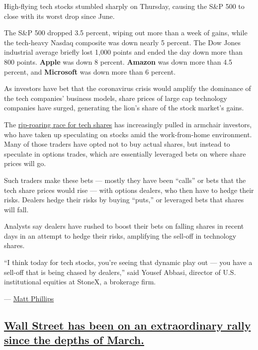 High-flying tech stocks stumbled sharply on Thursday, causing the S\&P
500 to close with its worst drop since June.

The S\&P 500 dropped 3.5 percent, wiping out more than a week of gains,
while the tech-heavy Nasdaq composite was down nearly 5 percent. The Dow
Jones industrial average briefly lost 1,000 points and ended the day
down more than 800 points. \textbf{Apple} was down 8 percent.
\textbf{Amazon} was down more than 4.5 percent, and \textbf{Microsoft}
was down more than 6 percent.

As investors have bet that the coronavirus crisis would amplify the
dominance of the tech companies' business models, share prices of large
cap technology companies have surged, generating the lion's share of the
stock market's gains.

The
\href{https://www.nytimes3xbfgragh.onion/2020/08/18/business/stock-market-record.html}{rip-roaring
race for tech shares} has increasingly pulled in armchair investors, who
have taken up speculating on stocks amid the work-from-home environment.
Many of those traders have opted not to buy actual shares, but instead
to speculate in options trades, which are essentially leveraged bets on
where share prices will go.

Such traders make these bets --- mostly they have been ``calls'' or bets
that the tech share prices would rise --- with options dealers, who then
have to hedge their risks. Dealers hedge their risks by buying ``puts,''
or leveraged bets that shares will fall.

Analysts say dealers have rushed to boost their bets on falling shares
in recent days in an attempt to hedge their risks, amplifying the
sell-off in technology shares.

``I think today for tech stocks, you're seeing that dynamic play out ---
you have a sell-off that is being chased by dealers,'' said Yousef
Abbasi, director of U.S. institutional equities at StoneX, a brokerage
firm.

--- \href{https://www.nytimes3xbfgragh.onion/by/matt-phillips}{Matt
Phillips}

\hypertarget{wall-street-has-been-on-an-extraordinary-rally-since-the-depths-of-march}{%
\subsection{\texorpdfstring{\protect\hyperlink{wall-street-has-been-on-an-extraordinary-rally-since-the-depths-of-march}{Wall
Street has been on an extraordinary rally since the depths of
March.}}{Wall Street has been on an extraordinary rally since the depths of March.}}\label{wall-street-has-been-on-an-extraordinary-rally-since-the-depths-of-march}}

